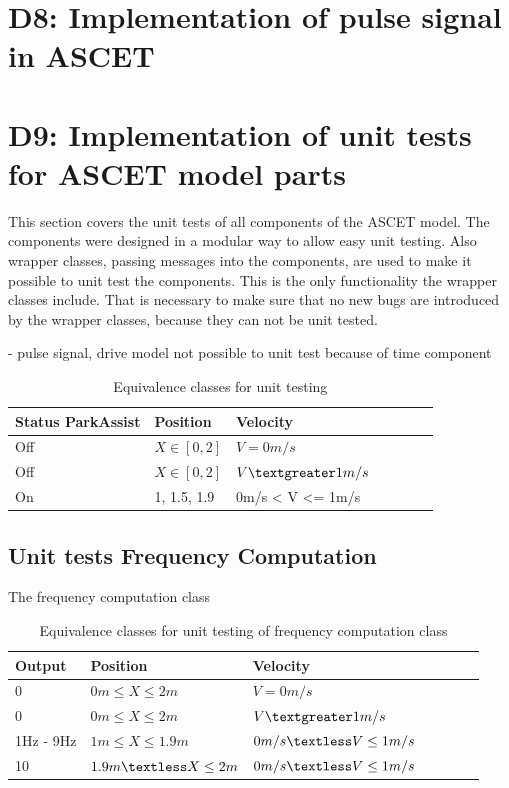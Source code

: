 \chapter{D8: Implementation of pulse signal in ASCET}\label{cha:D8}

\chapter{D9: Implementation of unit tests for ASCET model parts}\label{cha:D9}
This section covers the unit tests of all components of the ASCET model.
The components were designed in a modular way to allow easy unit testing.
Also wrapper classes, passing messages into the components, are used to make it possible to unit test the components.
This is the only functionality the wrapper classes include.
That is necessary to make sure that no new bugs are introduced by the wrapper classes, because they can not be unit tested.

- pulse signal, drive model not possible to unit test because of time component

\begin{table}[H]
\centering
\caption{Equivalence classes for unit testing}
\begin{adjustbox}{width=1\textwidth, center=\textwidth}
\renewcommand{\arraystretch}{1}
\begin{tabular}{lllllll}
\textbf{Status ParkAssist} & \textbf{Position} & \textbf{Velocity}\\\hline
Off & $X \in [0,2]$ & $V = 0m/s$ \\
Off & $X \in [0,2]$ & $V \textgreater 1m/s$ \\
On & {1, 1.5, 1.9} & 0m/s < V <= 1m/s \\
\end{tabular}
\end{adjustbox}
\end{table}

\section{Unit tests Frequency Computation}

The frequency computation class 

\begin{table}[H]
\centering
\caption{Equivalence classes for unit testing of frequency computation class}
\begin{adjustbox}{width=1\textwidth, center=\textwidth}
\renewcommand{\arraystretch}{1}
\begin{tabular}{lllllll}
\textbf{Output} & \textbf{Position} & \textbf{Velocity}\\\hline
0 & $0m \leq X \leq 2m$ & $V = 0m/s$ \\
0 & $0m \leq X \leq 2m$ & $V \textgreater 1m/s$\\
1Hz - 9Hz & $1m \leq X \leq 1.9m$  & $0m/s \textless V \leq 1m/s$ \\
10 & $1.9m \textless X \leq 2m$  & $0m/s \textless V \leq 1m/s$ \\
\end{tabular}
\end{adjustbox}
\end{table}

